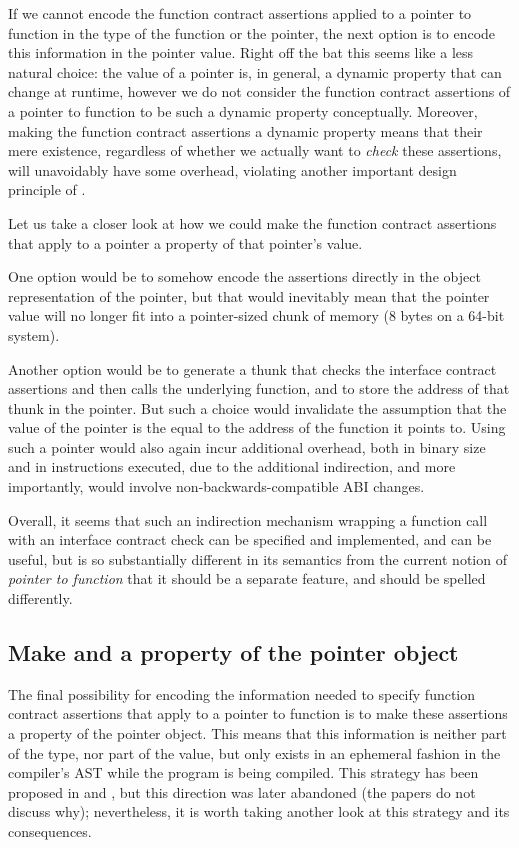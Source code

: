 If we cannot encode the function contract assertions applied to a pointer to function in the type of the function or the pointer, the next option is to encode this information in the pointer value. Right off the bat this seems like a less natural choice: the value of a pointer is, in general, a dynamic property that can change at runtime, however we do not consider the function contract assertions of a pointer to function to be such a dynamic property conceptually. Moreover, making the function contract assertions a dynamic property means that their mere existence, regardless of whether we actually want to \emph{check} these assertions, will unavoidably have some overhead, violating another important design principle of \cite{P2900R7}.

Let us take a closer look at how we could make the function contract assertions that apply to a pointer a property of that pointer's value.

One option would be to somehow encode the assertions directly in the object representation of the pointer, but that would inevitably mean that the pointer value will no longer fit into a pointer-sized chunk of memory (8 bytes on a 64-bit system).

Another option would be to generate a thunk that checks the interface contract assertions and then calls the underlying function, and to store the address of that thunk in the pointer. But such a choice would invalidate the assumption that the value of the pointer is the equal to the address of the function it points to. Using such a pointer would also again incur additional overhead, both in binary size and in instructions executed, due to the additional indirection, and more importantly, would involve non-backwards-compatible ABI changes.

Overall, it seems that such an indirection mechanism wrapping a function call with an interface contract check can be specified and implemented, and can be useful, but is so substantially different in its semantics from the current notion of \emph{pointer to function} that it should be a separate feature, and should be spelled differently.

\subsection{Make  and  a property of the pointer object}
\label{subsec:makeobject}

The final possibility for encoding the information needed to specify function contract assertions that apply to a pointer to function is to make these assertions a property of the pointer object. This means that this information is neither part of the type, nor part of the value, but only exists in an ephemeral fashion in the compiler's AST while the program is being compiled. This strategy has been proposed in \cite{P0246R0} and \cite{P0247R0}, but this direction was later abandoned (the papers do not discuss why); nevertheless, it is worth taking another look at this strategy and its consequences.

